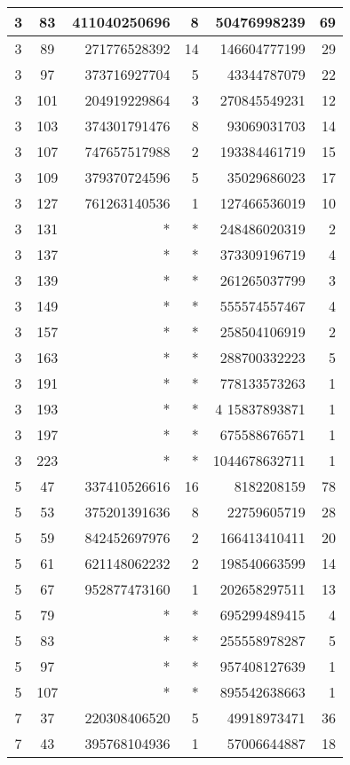 \documentclass{mcom-l}
\theoremstyle{definition}
\begin{document}
\begin{longtable}[c]{| c | c || r | r | r | r |}
3	& 83	& {411040250696}	& 8	& 50476998239	& 69\\
\hline
3	& 89	& {271776528392}	& 14	& 146604777199	& 29\\
\hline
3	& 97	& {373716927704}	& 5	& 43344787079	& 22\\
\hline
3	& 101	& {204919229864}	& 3	& {270845549231}	& 12\\
\hline
3	& 103	& {374301791476}	& 8	& 93069031703	& 14\\
\hline
3	& 107	& {747657517988}	& 2	& 193384461719	& 15\\
\hline
3	& 109	& {379370724596}	& 5	& 35029686023	& 17\\
\hline
3	& 127	& {761263140536}	& 1	& 127466536019	& 10\\
\hline
3	& 131	& *	& *	& {248486020319}	& 2\\
\hline
3	& 137	& *	& *	& {373309196719}	& 4\\
\hline
3	& 139	& *	& *	& {261265037799}	& 3\\
\hline
3	& 149	& *	& *	& {555574557467}	& 4\\
\hline
3	& 157	& *	& *	& {258504106919}	& 2\\
\hline
3	& 163	& *	& *	& {288700332223}	& 5\\
\hline
3	& 191	& *	& *	& {778133573263}	& 1\\
\hline
3	& 193	& *	& *	& 4 {15837893871}	& 1\\
\hline
3	& 197	& *	& *	&  {675588676571}	& 1\\
\hline
3	& 223	& *	& *	&  {1044678632711}	& 1\\
\hline
5	& 47	&  {337410526616}	& 16	& 8182208159	& 78\\
\hline
5	& 53	&  {375201391636}	& 8	& 22759605719	& 28\\
\hline
5	& 59	&  {842452697976}	& 2	& 166413410411	& 20\\
\hline
5	& 61	&  {621148062232}	& 2	& 198540663599	& 14\\
\hline
5	& 67	&  {952877473160}	& 1	& { 202658297511}	& 13\\
\hline
5	& 79	& *	& *	&  {695299489415}	& 4\\
\hline
5	& 83	& *	& *	&  {255558978287}	& 5\\
\hline
5	& 97	& *	& *	&  {957408127639}	& 1\\
\hline
5	& 107	& *	& *	&  {895542638663}	& 1\\
\hline
7	& 37	&  {220308406520}	& 5	& 49918973471	& 36\\
\hline
7	& 43	&  {395768104936}	& 1	& 57006644887	& 18\\

\end{longtable}
\end{document}
